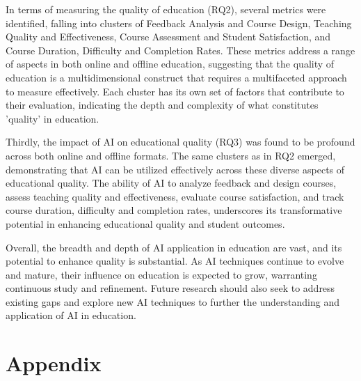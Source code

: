 In terms of measuring the quality of education (RQ2), several metrics were identified, falling into clusters of Feedback Analysis and Course Design, Teaching Quality and Effectiveness, Course Assessment and Student Satisfaction, and Course Duration, Difficulty and Completion Rates. These metrics address a range of aspects in both online and offline education, suggesting that the quality of education is a multidimensional construct that requires a multifaceted approach to measure effectively. Each cluster has its own set of factors that contribute to their evaluation, indicating the depth and complexity of what constitutes 'quality' in education.

Thirdly, the impact of AI on educational quality (RQ3) was found to be profound across both online and offline formats. The same clusters as in RQ2 emerged, demonstrating that AI can be utilized effectively across these diverse aspects of educational quality. The ability of AI to analyze feedback and design courses, assess teaching quality and effectiveness, evaluate course satisfaction, and track course duration, difficulty and completion rates, underscores its transformative potential in enhancing educational quality and student outcomes.


Overall, the breadth and depth of AI application in education are vast, and its potential to enhance quality is substantial. As AI techniques continue to evolve and mature, their influence on education is expected to grow, warranting continuous study and refinement. Future research should also seek to address existing gaps and explore new AI techniques to further the understanding and application of AI in education.

\section{Appendix}
\label{Appendix}

